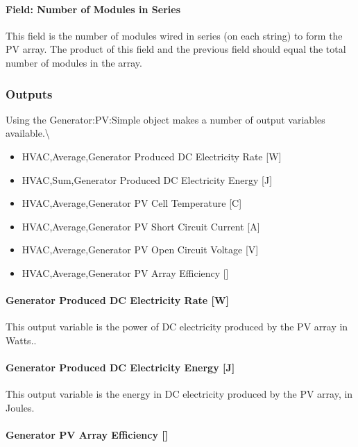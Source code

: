 \paragraph{Field: Number of Modules in Series}\label{field-number-of-modules-in-series}

This field is the number of modules wired in series (on each string) to form the PV array. The product of this field and the previous field should equal the total number of modules in the array.

\subsubsection{Outputs}\label{outputs-11-001}

Using the Generator:PV:Simple object makes a number of output variables available.\textbackslash{}

\begin{itemize}
\item
  HVAC,Average,Generator Produced DC Electricity Rate {[}W{]}
\item
  HVAC,Sum,Generator Produced DC Electricity Energy {[}J{]}
\item
  HVAC,Average,Generator PV Cell Temperature {[}C{]}
\item
  HVAC,Average,Generator PV Short Circuit Current {[}A{]}
\item
  HVAC,Average,Generator PV Open Circuit Voltage {[}V{]}
\item
  HVAC,Average,Generator PV Array Efficiency {[]}
\end{itemize}

\paragraph{Generator Produced DC Electricity Rate {[}W{]}}\label{generator-produced-dc-electric-power-w-2}

This output variable is the power of DC electricity produced by the PV array in Watts..

\paragraph{Generator Produced DC Electricity Energy {[}J{]}}\label{generator-produced-dc-electric-energy-j}

This output variable is the energy in DC electricity produced by the PV array, in Joules.

\paragraph{Generator PV Array Efficiency {[]}}\label{generator-pv-array-efficiency}

